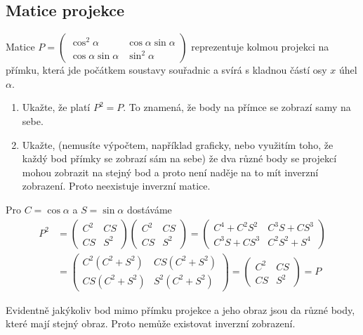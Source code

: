 \subsection{Matice projekce}
Matice $P=
\begin{pmatrix}
  \cos^2 \alpha & \cos \alpha \sin \alpha \\
  \cos\alpha\sin\alpha & \sin^2 \alpha
\end{pmatrix}
$ reprezentuje kolmou projekci na přímku, která jde počátkem soustavy souřadnic a svírá s kladnou částí osy $x$ úhel $\alpha$.
\begin{enumerate}
\item Ukažte, že platí $P^2=P$. To znamená, že body na přímce se
  zobrazí samy na sebe.
\item Ukažte, (nemusíte výpočtem, například graficky, nebo využitím
  toho, že každý bod přímky se zobrazí sám na sebe) že dva různé body
  se projekcí mohou zobrazit na stejný bod a proto není naděje na to
  mít inverzní zobrazení. Proto neexistuje inverzní matice.
\end{enumerate}

\reseni
Pro $C=\cos \alpha$ a $S=\sin\alpha$ dostáváme
\begin{equation*}
  \begin{aligned}
P^2&=
  \begin{pmatrix}
    C^2 & CS \\CS & S^2
  \end{pmatrix}
  \begin{pmatrix}
    C^2 & CS \\CS & S^2
  \end{pmatrix}
=
\begin{pmatrix}
  C^4+C^2S^2 & C^3S+CS^3 \\
C^3S+CS^3 & C^2S^2+S^4
\end{pmatrix}
\\&=
\begin{pmatrix}
  C^2(C^2+S^2) & CS(C^2+S^2) \\
CS(C^2+S^2) & S^2(C^2+S^2)
\end{pmatrix}
=
\begin{pmatrix}
  C^2 & CS \\
CS & S^2
\end{pmatrix}
=P
\end{aligned}
\end{equation*}

Evidentně jakýkoliv bod mimo přímku projekce a jeho obraz jsou da různé body, které mají stejný obraz. Proto nemůže existovat inverzní zobrazení.

